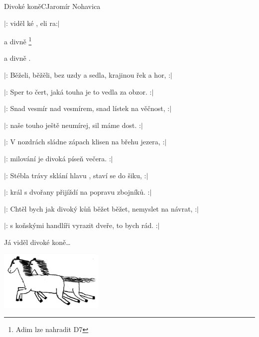 \setcounter{page}{21}
\begin{song}{Divoké koně}{C}{Jaromír Nohavica}

\begin{SBVerse}

$|$: viděl ké , eli ra:$|$

  a divně \footnote{Adim lze nahradit D7}

   a divně .

\end{SBVerse}

\begin{SBVerse}
$|$: Běželi, běžěli, bez uzdy a sedla, krajinou řek a hor, :$|$

$|$: Sper to čert, jaká touha je to vedla za obzor. :$|$
\end{SBVerse}

\begin{SBVerse}

$|$: Snad vesmír nad vesmírem, snad lístek na věčnost, :$|$

$|$: naše touho ještě neumírej, sil máme dost. :$|$

\end{SBVerse}

\begin{SBVerse}
$|$: V nozdrách sládne zápach klisen na břehu jezera, :$|$

$|$: milování je divoká píseň večera. :$|$
\end{SBVerse}

\begin{SBVerse}
$|$: Stébla trávy sklání hlavu , staví se do šiku, :$|$

$|$: král s dvořany přijíždí na popravu zbojníků. :$|$
\end{SBVerse}

\begin{SBVerse}
$|$: Chtěl bych jak divoký kůň běžet běžet, nemyslet na návrat, :$|$

$|$: s koňskými handlíři vyrazit dveře, to bych rád. :$|$
\end{SBVerse}

\begin{SBVerse}
Já viděl divoké koně\dots
\end{SBVerse}
\begin{center}
\includegraphics[width=5cm]{pict/divoci_kone}
\end{center}
\end{song}

\pagebreak
